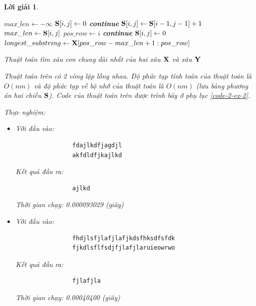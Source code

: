 \documentclass[14pt, a4paper]{article}
\theoremstyle{sltheorem}
\theoremstyle{soltheorem}
\newtheorem*{loigiai}{Lời giải}
\begin{document}
\begin{loigiai}
\begin{itemize} [label={$-$}]
\begin{algorithm}[h!]
            $max\_len \gets - \infty$\;
             {
                 {
                     {
                        $\bold{S} \lbrack i, j \rbrack \gets 0$\;
                        \textbf{continue}\;
                    }
                     {
                        $\bold{S} \lbrack i, j \rbrack \gets \bold{S} \lbrack i - 1, j - 1 \rbrack + 1$\;
                         {
                            $max\_len \gets \bold{S} \lbrack i, j \rbrack$\;
                            $pos\_row \gets i$\;
                        }
                        \textbf{continue}\;
                    }
                     {
                        $\bold{S} \lbrack i, j \rbrack \gets 0$\;
                    }
                }
            }
            $longest\_substring \gets \bold{X} \lbrack pos\_row - max\_len + 1: pos\_row \rbrack$\;
            \;
            \caption{Thuật toán tìm xâu con chung dài nhất của hai xâu $\bold{X}$ và xâu $\bold{Y}$}
            \label{alg:longest-substring}
        \end{algorithm}

        Thuật toán trên có 2 vòng lặp lồng nhau.
        Độ phức tạp tính toán của thuật toán là $O(nm)$ và độ phức tạp về bộ nhớ của thuật toán là $O(nm)$ (lưu bảng phương án hai chiều $\bold{S}$).
        Code của thuật toán trên được trình bày ở phụ lục \ref{code-2-ex-2}.

        Thực nghiệm:

        \begin{itemize}
            \item Với đầu vào:
            \begin{verbatim}
                fdajlkdfjagdjl
                akfdldfjkajlkd
            \end{verbatim}
            Kết quả đầu ra:
            \begin{verbatim}
                ajlkd
            \end{verbatim}
            Thời gian chạy: 0.000093029 (giây)
            \item Với đầu vào:
            \begin{verbatim}
                fhdjlsfjlafjlafjkdsfhksdfsfdk  
                fjkdlsflfsdjfjlafjlaruieowrwo
            \end{verbatim}
            Kết quả đầu ra:
            \begin{verbatim}
                fjlafjla
            \end{verbatim}
            Thời gian chạy: 0.00040400 (giây)
        \end{itemize}


\end{itemize}
\end{loigiai}
\end{document}
